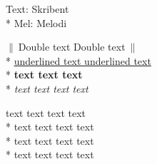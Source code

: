 \begin{SongText}[Låtnamn]
    \begin{SongInfo}
        Text: Skribent\\*%
        Mel: Melodi
    \end{SongInfo}
    \begin{SongVerse}
        $\|\:$Double text Double text$\:\|$\\*%
        \underline{underlined text underlined text}\\*%
        \textbf{text text text}\\*%
        \textit{text text text text}
    \end{SongVerse}
    \begin{SongVerse}
        text text text text\\*%
        text text text text\\*%
        text text text text\\*%
        text text text text 
    \end{SongVerse}
\end{SongText}